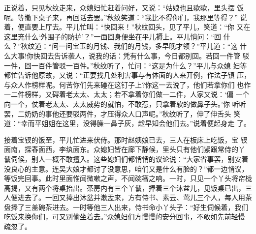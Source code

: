 正说着，只见秋纹走来，众媳妇忙赶着问好，又说：“姑娘也且歇歇，里头摆
饭呢。等撤下桌子来，再回话去罢。”秋纹笑道：“我比不得你们，我那里等得？”
说着，便直要上厅去。平儿忙叫：“快回来！”秋纹回头，见了平儿，笑道：“你
又在这里充什么‘外围子的防护’？”一面回身便坐在平儿褥上。平儿悄问：“回
什么？”秋纹道：“问一问宝玉的月钱、我们的月钱，多早晚才领？”平儿道：“这
什么大事!你快回去告诉袭人，说我的话：凭有什么事，今日都别回。若回一件管
驳一件，回一百件管驳一百件。”秋纹听了，忙问：“这是为什么？”平儿与众媳
妇等都忙告诉他原故，又说：“正要找几处利害事与有体面的人来开例，作法子镇
压，与众人作榜样呢。何苦你们先来碰在这钉子上?你这一去说了，他们若拿你们
也作一二件榜样，又碍着老太太、太太；若不拿着你们做一二件，人家又说：‘偏
一个向一个，仗着老太太、太太威势的就怕，不敢惹，只拿着软的做鼻子头。’你
听听罢，二奶奶的事他还要驳两件，才压得众人口声呢。”秋纹听了，伸了伸舌头
笑道：“幸而平姐姐在这里，没得臊一鼻子灰，趁早知会他们去。”说着便起身走
了。

接着宝钗的饭至，平儿忙进来伏侍。那时赵姨娘已去，三人在板床上吃饭，宝
钗面南，探春面西，李纨面东。众媳妇皆在廊下静候，里头只有他们紧跟常侍的丫
鬟伺候，别人一概不敢擅入。这些媳妇们都悄悄的议论说：“大家省事罢，别安着
没良心的主意。连吴大娘才都讨了没意思，咱们又是什么有脸的？”都一边悄议，
等饭完回事。此时里面惟闻微嗽之声，不闻碗箸之响。一时，只见一个丫头将帘栊
高揭，又有两个将桌抬出。茶房内有三个丫鬟，捧着三个沐盆儿，见饭桌已出，三
人便进去了。一回又捧出沐盆并漱盂来，方有侍书、素云、莺儿三个人，每人用茶
盘捧了三盖碗茶进去。一时等他三人出来，侍书命小丫头子：“好生伺候着，我们
吃饭来换你们，可又别偷坐着去。”众媳妇们方慢慢的安分回事，不敢如先前轻慢
疏忽了。

